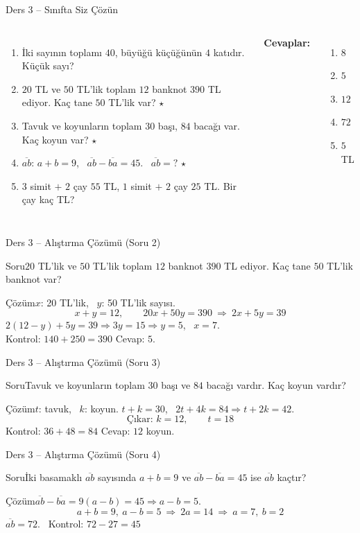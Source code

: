 \documentclass[aspectratio=169,11pt]{beamer}
\newcommand{\soru}[3]{%
\begin{frame}{#1}
  \begin{block}{Soru}\large #2\end{block}
  \pause
  \begin{exampleblock}{Çözüm}\large #3\end{exampleblock}
\end{frame}}
\newcommand{\ab}[1]{\overline{#1}}
\begin{document}
\begin{frame}{Ders 3 -- Sınıfta Siz Çözün}
\begin{columns}[t]
\begin{enumerate}
\item İki sayının toplamı \(40\), büyüğü küçüğünün \(4\) katıdır. Küçük sayı?
\item \(20\) TL ve \(50\) TL'lik toplam \(12\) banknot \(390\) TL ediyor. Kaç tane \(50\) TL'lik var? \(\star\)
\item Tavuk ve koyunların toplam \(30\) başı, \(84\) bacağı var. Kaç koyun var? \(\star\)
\item \(\ab{ab}\): \(a+b=9\), \ \(\ab{ab}-\ab{ba}=45\). \ \(\ab{ab}=?\) \(\star\)
\item \(3\) simit \(+\) \(2\) çay \(55\) TL, \(1\) simit \(+\) \(2\) çay \(25\) TL. Bir çay kaç TL?
\end{enumerate}
\pause
\textbf{Cevaplar:}
\begin{enumerate}
\item \(8\)
\item \(5\)
\item \(12\)
\item \(72\)
\item \(5\) TL
\end{enumerate}
\end{columns}
\vspace{4pt}{\footnotesize \(\star\) işaretli soruların adım adım çözümü sonraki slaytlardadır.}
\end{frame}

\soru{Ders 3 -- Alıştırma Çözümü (Soru 2)}
{\(20\) TL'lik ve \(50\) TL'lik toplam \(12\) banknot \(390\) TL ediyor. Kaç tane \(50\) TL'lik banknot var?}
{\(x\): 20 TL'lik, \ \(y\): 50 TL'lik sayısı.
\[x+y=12,\qquad 20x+50y=390\ \Rightarrow\ 2x+5y=39\]
\(2(12-y)+5y=39\Rightarrow 3y=15\Rightarrow y=5\), \ \(x=7\).\\[2pt]
Kontrol: \(140+250=390\) \checkmark \quad Cevap: \(5\).}

\soru{Ders 3 -- Alıştırma Çözümü (Soru 3)}
{Tavuk ve koyunların toplam \(30\) başı ve \(84\) bacağı vardır. Kaç koyun vardır?}
{\(t\): tavuk, \ \(k\): koyun. \quad \(t+k=30\), \ \(2t+4k=84\Rightarrow t+2k=42\).
\[\text{Çıkar: } k=12,\qquad t=18\]
Kontrol: \(36+48=84\) \checkmark \quad Cevap: \(12\) koyun.}

\soru{Ders 3 -- Alıştırma Çözümü (Soru 4)}
{İki basamaklı \(\ab{ab}\) sayısında \(a+b=9\) ve \(\ab{ab}-\ab{ba}=45\) ise \(\ab{ab}\) kaçtır?}
{\(\ab{ab}-\ab{ba}=9(a-b)=45\Rightarrow a-b=5\).
\[a+b=9,\ a-b=5\ \Rightarrow\ 2a=14\ \Rightarrow\ a=7,\ b=2\]
\(\ab{ab}=72\). \ Kontrol: \(72-27=45\) \checkmark}
\end{document}
